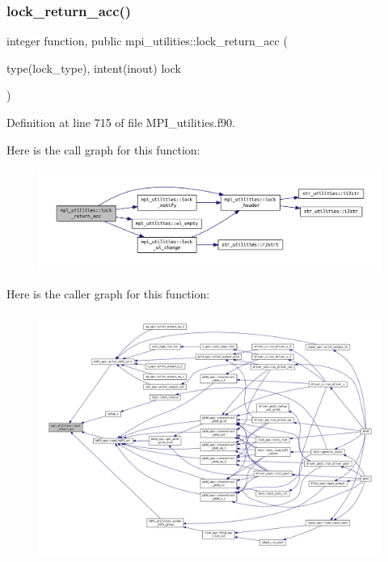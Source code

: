 \subsubsection{\texorpdfstring{lock\+\_\+return\+\_\+acc()}{lock\_return\_acc()}}
{\footnotesize\ttfamily integer function, public mpi\+\_\+utilities\+::lock\+\_\+return\+\_\+acc (\begin{DoxyParamCaption}\item[{type(lock\+\_\+type), intent(inout)}]{lock }\end{DoxyParamCaption})}



Definition at line 715 of file M\+P\+I\+\_\+utilities.\+f90.

Here is the call graph for this function\+:
\nopagebreak
\begin{figure}[H]
\begin{center}
\leavevmode
\includegraphics[width=350pt]{namespacempi__utilities_a86f9982a0f92b51a916f832d9a3d8ba9_cgraph}
\end{center}
\end{figure}
Here is the caller graph for this function\+:
\nopagebreak
\begin{figure}[H]
\begin{center}
\leavevmode
\includegraphics[width=350pt]{namespacempi__utilities_a86f9982a0f92b51a916f832d9a3d8ba9_icgraph}
\end{center}
\end{figure}
\mbox{\label{namespacempi__utilities_a0417983d618bfc9f892d6d2af5d27b1d}} 
